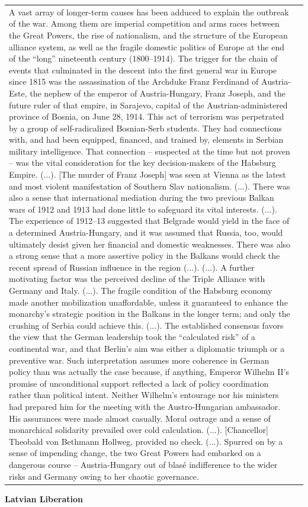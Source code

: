 {\begin{longtable}{p{}p{}}
A vast array of longer-term causes has been adduced to explain the outbreak of the war. Among them are imperial competition and arms races between the Great Powers, the rise of nationalism, and the structure of the European alliance system, as well as the fragile domestic politics of Europe at the end of the “long” nineteenth century (1800–1914). The trigger for the chain of events that culminated in the descent into the first general war in Europe since 1815 was the assassination of the Archduke Franz Ferdinand of Austria-Este, the nephew of the emperor of Austria-Hungary, Franz Joseph, and the future ruler of that empire, in Sarajevo, capital of the Austrian-administered province of Bosnia, on June 28, 1914. This act of terrorism was perpetrated by a group of self-radicalized Bosnian-Serb students. They had connections with, and had been equipped, financed, and trained by, elements in Serbian military intelligence. That connection – suspected at the time but not proven – was the vital consideration for the key decision-makers of the Habsburg Empire. (...). [The murder of Franz Joseph] was seen at Vienna as the latest and most violent manifestation of Southern Slav nationalism. (...). There was also a sense that international mediation during the two previous Balkan wars of 1912 and 1913 had done little to safeguard its vital interests. (...). The experience of 1912–13 suggested that Belgrade would yield in the face of a determined Austria-Hungary, and it was assumed that Russia, too, would ultimately desist given her financial and domestic weaknesses. There was also a strong sense that a more assertive policy in the Balkans would check the recent spread of Russian influence in the region (...). (...). A further motivating factor was the perceived decline of the Triple Alliance with Germany and Italy. (...). The fragile condition of the Habsburg economy made another mobilization unaffordable, unless it guaranteed to enhance the monarchy's strategic position in the Balkans in the longer term; and only the crushing of Serbia could achieve this. (...). The established consensus favors the view that the German leadership took the “calculated risk” of a continental war, and that Berlin's aim was either a diplomatic triumph or a preventive war. Such interpretation assumes more coherence in German policy than was actually the case because, if anything, Emperor Wilhelm II's promise of unconditional support reflected a lack of policy coordination rather than political intent. Neither Wilhelm's entourage nor his ministers had prepared him for the meeting with the Austro-Hungarian ambassador. His assurances were made almost casually. Moral outrage and a sense of monarchical solidarity prevailed over cold calculation. (...). [Chancellor] Theobald von Bethmann Hollweg, provided no check. (...). Spurred on by a sense of impending change, the two Great Powers had embarked on a dangerous course – Austria-Hungary out of blasé indifference to the wider risks and Germany owing to her chaotic governance.
\\
\end{longtable}}
\clearpage
         \textbf{Latvian Liberation} 

